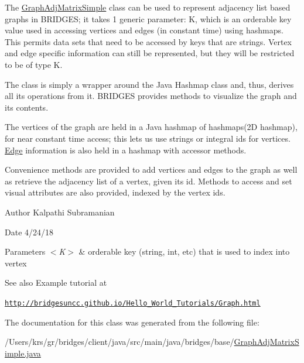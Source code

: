 The \hyperlink{classbridges_1_1base_1_1_graph_adj_matrix_simple}{Graph\+Adj\+Matrix\+Simple} class can be used to represent adjacency list based graphs in B\+R\+I\+D\+G\+E\+S; it takes 1 generic parameter\+: K, which is an orderable key value used in accessing vertices and edges (in constant time) using hashmaps. This permits data sets that need to be accessed by keys that are strings. Vertex and edge specific information can still be represented, but they will be restricted to be of type K.

The class is simply a wrapper around the Java Hashmap class and, thus, derives all its operations from it. B\+R\+I\+D\+G\+E\+S provides methods to visualize the graph and its contents.

The vertices of the graph are held in a Java hashmap of hashmaps(2\+D hashmap), for near constant time access; this lets us use strings or integral ids for vertices. \hyperlink{classbridges_1_1base_1_1_edge}{Edge} information is also held in a hashmap with accessor methods.

Convenience methods are provided to add vertices and edges to the graph as well as retrieve the adjacency list of a vertex, given its id. Methods to access and set visual attributes are also provided, indexed by the vertex ids.

\begin{DoxyAuthor}{Author}
Kalpathi Subramanian
\end{DoxyAuthor}
\begin{DoxyDate}{Date}
4/24/18
\end{DoxyDate}

\begin{DoxyParams}{Parameters}
{\em $<$\+K$>$} & orderable key (string, int, etc) that is used to index into vertex\\
\hline
\end{DoxyParams}
\begin{DoxySeeAlso}{See also}
Example tutorial at 
\end{DoxySeeAlso}
\href{http://bridgesuncc.github.io/Hello_World_Tutorials/Graph.html}{\tt http\+://bridgesuncc.\+github.\+io/\+Hello\+\_\+\+World\+\_\+\+Tutorials/\+Graph.\+html} 

The documentation for this class was generated from the following file\+:\begin{DoxyCompactItemize}
\item 
/\+Users/krs/gr/bridges/client/java/src/main/java/bridges/base/\hyperlink{_graph_adj_matrix_simple_8java}{Graph\+Adj\+Matrix\+Simple.\+java}\end{DoxyCompactItemize}

